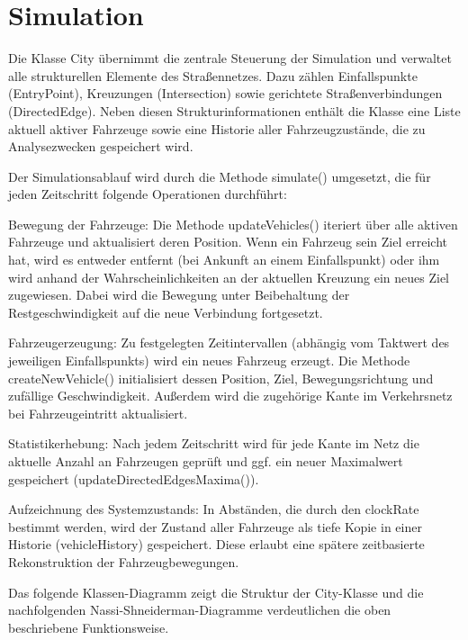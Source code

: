\clearpage

\section{Simulation}

Die Klasse City übernimmt die zentrale Steuerung der Simulation und verwaltet alle strukturellen Elemente des Straßennetzes.
Dazu zählen Einfallspunkte (EntryPoint), Kreuzungen (Intersection) sowie gerichtete Straßenverbindungen (DirectedEdge).
Neben diesen Strukturinformationen enthält die Klasse eine Liste aktuell aktiver Fahrzeuge sowie eine Historie aller Fahrzeugzustände,
die zu Analysezwecken gespeichert wird.

Der Simulationsablauf wird durch die Methode simulate() umgesetzt,
die für jeden Zeitschritt folgende Operationen durchführt:

Bewegung der Fahrzeuge: Die Methode updateVehicles() iteriert über alle aktiven Fahrzeuge und aktualisiert deren Position.
Wenn ein Fahrzeug sein Ziel erreicht hat,
wird es entweder entfernt (bei Ankunft an einem Einfallspunkt) oder ihm wird anhand der Wahrscheinlichkeiten an der aktuellen Kreuzung ein neues Ziel zugewiesen.
Dabei wird die Bewegung unter Beibehaltung der Restgeschwindigkeit auf die neue Verbindung fortgesetzt.

Fahrzeugerzeugung: Zu festgelegten Zeitintervallen (abhängig vom Taktwert des jeweiligen Einfallspunkts) wird ein neues Fahrzeug erzeugt.
Die Methode createNewVehicle() initialisiert dessen Position, Ziel, Bewegungsrichtung und zufällige Geschwindigkeit.
Außerdem wird die zugehörige Kante im Verkehrsnetz bei Fahrzeugeintritt aktualisiert.

Statistikerhebung: Nach jedem Zeitschritt wird für jede Kante im Netz die aktuelle Anzahl an Fahrzeugen geprüft und ggf. ein neuer Maximalwert gespeichert (updateDirectedEdgesMaxima()).

Aufzeichnung des Systemzustands: In Abständen, die durch den clockRate bestimmt werden,
wird der Zustand aller Fahrzeuge als tiefe Kopie in einer Historie (vehicleHistory) gespeichert.
Diese erlaubt eine spätere zeitbasierte Rekonstruktion der Fahrzeugbewegungen.

Das folgende Klassen-Diagramm zeigt die Struktur der City-Klasse und die nachfolgenden Nassi-Shneiderman-Diagramme verdeutlichen die oben beschriebene Funktionsweise.

